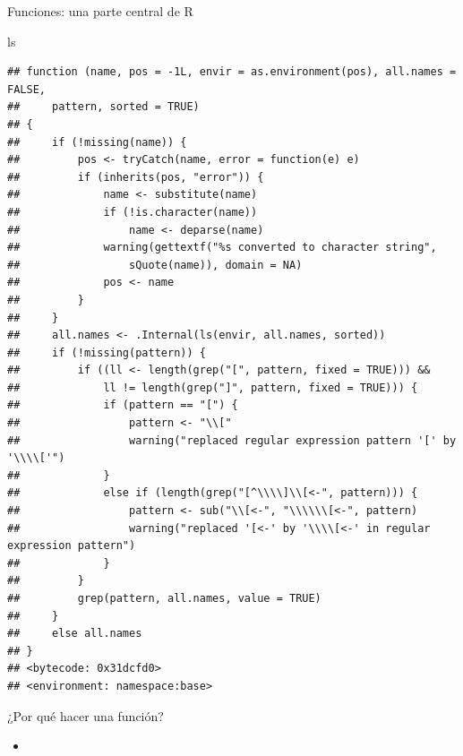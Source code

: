 \documentclass[ignorenonframetext,]{beamer}
\newenvironment{Shaded}{\begin{snugshade}}{\end{snugshade}}
\newcommand{\NormalTok}[1]{#1}
\begin{document}
\begin{frame}[fragile]{Funciones: una parte central de R}
\protect\hypertarget{funciones-una-parte-central-de-r-1}{}

\begin{Shaded}
\begin{Highlighting}[]
\NormalTok{ls}
\end{Highlighting}
\end{Shaded}

\begin{verbatim}
## function (name, pos = -1L, envir = as.environment(pos), all.names = FALSE, 
##     pattern, sorted = TRUE) 
## {
##     if (!missing(name)) {
##         pos <- tryCatch(name, error = function(e) e)
##         if (inherits(pos, "error")) {
##             name <- substitute(name)
##             if (!is.character(name)) 
##                 name <- deparse(name)
##             warning(gettextf("%s converted to character string", 
##                 sQuote(name)), domain = NA)
##             pos <- name
##         }
##     }
##     all.names <- .Internal(ls(envir, all.names, sorted))
##     if (!missing(pattern)) {
##         if ((ll <- length(grep("[", pattern, fixed = TRUE))) && 
##             ll != length(grep("]", pattern, fixed = TRUE))) {
##             if (pattern == "[") {
##                 pattern <- "\\["
##                 warning("replaced regular expression pattern '[' by  '\\\\['")
##             }
##             else if (length(grep("[^\\\\]\\[<-", pattern))) {
##                 pattern <- sub("\\[<-", "\\\\\\[<-", pattern)
##                 warning("replaced '[<-' by '\\\\[<-' in regular expression pattern")
##             }
##         }
##         grep(pattern, all.names, value = TRUE)
##     }
##     else all.names
## }
## <bytecode: 0x31dcfd0>
## <environment: namespace:base>
\end{verbatim}

\end{frame}

\begin{frame}{¿Por qué hacer una función?}
\protect\hypertarget{por-quuxe9-hacer-una-funciuxf3n}{}

\begin{itemize}
\item
\end{itemize}

\end{frame}
\end{document}
